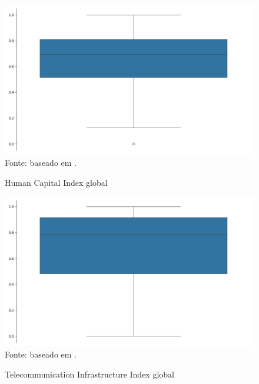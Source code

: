 \begin{figure}[H]
    \centering
    \caption{Human Capital Index global}
    \includegraphics[width=1\linewidth]{figuras/egdi/boxplot_hci_global.png}
    \label{fig:boxplot_hci_global}
    \footnotesize{Fonte: baseado em \cite{ONU_edgi_mapa}.}
\end{figure}

\begin{figure}[H]
    \centering
    \caption{Telecommunication Infrastructure Index global}
    \includegraphics[width=1\linewidth]{figuras/egdi/boxplot_tci_global.png}
    \label{fig:boxplot_tci_global}
    \footnotesize{Fonte: baseado em \cite{ONU_edgi_mapa}.}
\end{figure}


